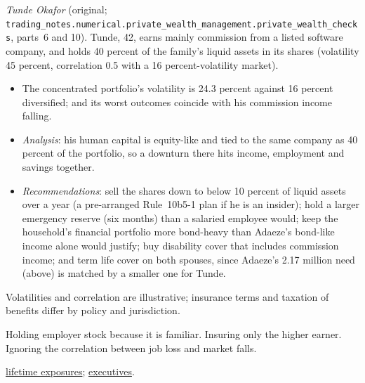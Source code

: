 \begin{qfmethod}
 \emph{Tunde Okafor} (original; \nolinkurl{trading_notes.numerical.private_wealth_management.private_wealth_checks}, parts~6 and 10). Tunde, 42, earns mainly commission from a listed software company, and holds 40 percent of the family's liquid assets in its shares (volatility 45 percent, correlation 0.5 with a 16 percent-volatility market).
\begin{itemize}
\item The concentrated portfolio's volatility is 24.3 percent against 16 percent diversified; and its worst outcomes coincide with his commission income falling.
\item \emph{Analysis}: his human capital is equity-like and tied to the same company as 40 percent of the portfolio, so a downturn there hits income, employment and savings together.
\item \emph{Recommendations}: sell the shares down to below 10 percent of liquid assets over a year (a pre-arranged Rule~10b5-1 plan if he is an insider); hold a larger emergency reserve (six months) than a salaried employee would; keep the household's financial portfolio more bond-heavy than Adaeze's bond-like income alone would justify; buy disability cover that includes commission income; and term life cover on both spouses, since Adaeze's 2.17 million need (above) is matched by a smaller one for Tunde.
\end{itemize}

 Volatilities and correlation are illustrative; insurance terms and taxation of benefits differ by policy and jurisdiction.

 Holding employer stock because it is familiar. Insuring only the higher earner. Ignoring the correlation between job loss and market falls.

 \hyperref[meth:lifetime-exposures]{lifetime exposures}; \hyperref[meth:complex-client-situations]{executives}.

\end{qfmethod}
